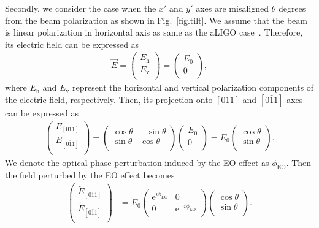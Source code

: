\documentclass[%
 reprint,
 superscriptaddress,
 amsmath,amssymb,
 aps,
]{revtex4-2}
\begin{document}
Secondly, we consider the case when the $x'$ and $y'$ axes are misaligned $\theta$ degrees from the beam polarization as shown in Fig.~\ref{fig.tilt}.
We assume that the beam is linear polarization in horizontal axis as same as the aLIGO case~\cite{Aasi2015}.
Therefore, its electric field can be expressed as
\begin{align}
    \vec{E} = \begin{pmatrix}
    E_{\mathrm{h}} \\ E_{\mathrm{v}} \\
    \end{pmatrix}
     = \begin{pmatrix}
    E_0 \\ 0 \\
    \end{pmatrix},
\end{align}
where $E_{\mathrm{h}}$ and $E_{\mathrm{v}}$ represent the horizontal and vertical polarization components of the electric field, respectively.
Then, its projection onto $[011]$ and $[0\bar{1}1]$ axes can be expressed as
\begin{align}
    \begin{pmatrix}
    E_{[011]} \\ E_{[0\bar{1}1]} \\
    \end{pmatrix}
    =
    \begin{pmatrix}
    \cos\theta & -\sin\theta  \\ \sin\theta & \cos\theta \\
    \end{pmatrix}
    \begin{pmatrix}
    E_0 \\ 0 \\
    \end{pmatrix}
    =
    E_0
    \begin{pmatrix}
    \cos\theta \\ \sin\theta \\
    \end{pmatrix}.
\end{align}
We denote the optical phase perturbation induced by the EO effect as $\phi_{\mathrm{EO}}$.
Then the field perturbed by the EO effect becomes
\begin{align}
    \begin{pmatrix}
    \tilde{E}_{[011]} \\ \tilde{E}_{[0\bar{1}1]} \\
    \end{pmatrix}
    &=
    E_0
    \begin{pmatrix}
    \mathrm{e}^{i\phi_{\mathrm{EO}}} & 0 \\ 0 & \mathrm{e}^{-i\phi_{\mathrm{EO}}} \\
    \end{pmatrix}
    \begin{pmatrix}
    \cos\theta \\ \sin\theta \\
    \end{pmatrix}.
\end{align}
\end{document}
